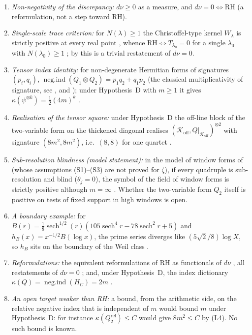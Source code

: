\documentclass[11pt]{amsart}
\theoremstyle{definition}
\theoremstyle{remark}
\newcommand{\RH}{\mathrm{RH}}
\newcommand{\Koff}{\mathcal{K}_{\mathrm{off}}}
\newcommand{\negind}{\operatorname{neg.ind}}
\newcommand{\dnu}{d\nu}
\begin{document}
\begin{enumerate}[\rm(L1)]
\item \emph{Non-negativity of the discrepancy:} $\dnu\ge0$ as a measure, and
$\dnu=0\iff\RH$ \cite[Cor.~3.2]{P24} (a reformulation, not a step toward RH).
\item \emph{Single-scale trace criterion:} for $N(\lambda)\ge1$ the Christoffel-type
kernel $W_\lambda$ is strictly positive at every real point \cite[Thm~4.2]{P27},
whence $\RH\iff T_{\lambda_0}=0$ for a single $\lambda_0$ with
$N(\lambda_0)\ge1$ \cite[Thm~4.4]{P27}; by \cite{P27} this is a trivial
restatement of $\dnu=0$.
\item \emph{Tensor index identity:} for non-degenerate Hermitian forms of
signatures $(p_i,q_i)$, $\negind(Q_1\otimes Q_2)=p_1q_2+q_1p_2$ (the
classical multiplicativity of signature, see \cite[Ch.~II]{Lam}, and
\cite[Thm~4.1]{P28}); under Hypothesis~D with $m\ge1$ it gives
$\kappa(\psi^{\otimes k})=\tfrac12(4m)^k$ \cite[Thm~4.2]{P28}.
\item \emph{Realisation of the tensor square:} under Hypothesis~D the
off-line block of the two-variable form on the thickened diagonal realises
$(\Koff,Q|_{\Koff})^{\otimes2}$ with signature $(8m^2,8m^2)$, i.e.\ $(8,8)$
for one quartet \cite[Thm~5.1]{P28}.
\item \emph{Sub-resolution blindness (model statement):} in the model of
window forms of \cite[Def.~4.3]{P26} (whose assumptions (S1)--(S3) are not
proved for $\zeta$), if every quadruple is sub-resolution and blind
($\theta_j=0$), the symbol of the field of window forms is strictly positive although
$m=\infty$ \cite[Thm~4.10]{P26}. Whether the two-variable form $Q_2$ itself
is positive on tests of fixed support in high windows is open.
\item \emph{A boundary example:} for
$B(r)=\tfrac18\operatorname{sech}^{1/2}(r)(105\operatorname{sech}^4
r-78\operatorname{sech}^2 r+5)$ and $h_B(x)=x^{-1/2}B(\log x)$, the prime
series diverges like $(5\sqrt2/8)\log X$, so $h_B$ sits on the boundary of
the Weil class \cite[\S3.3]{P28}.
\item \emph{Reformulations:} the equivalent reformulations of RH as
functionals of $\dnu$ \cite[Thm~4.1]{P24}, all restatements of $\dnu=0$
\cite[Rem.~7.2]{P24}; and, under Hypothesis~D, the index dictionary
$\kappa(Q)=\negind(H_C)=2m$ \cite[Prop.~5.3]{P25}.
\item \emph{An open target weaker than RH:} a bound, from the arithmetic side,
on the relative negative index that is independent of $m$ would bound $m$
under Hypothesis~D: for instance $\kappa(Q_2^{\mathrm{rel}})\le C$ would give
$8m^2\le C$ by (L4). No such bound is known.
\end{enumerate}
\end{document}
